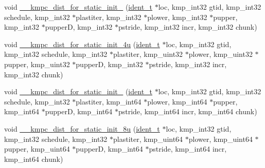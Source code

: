 \begin{DoxyCompactItemize}
\item 
void \hyperlink{group__WORK__SHARING_gab1acaeaf1525bb1d998ba2110c268b24}{\-\_\-\-\_\-kmpc\-\_\-dist\-\_\-for\-\_\-static\-\_\-init\-\_} (\hyperlink{group__BASIC__TYPES_ga690fda6b92f039a72db263c6b4394ddb}{ident\-\_\-t} $\ast$loc, kmp\-\_\-int32 gtid, kmp\-\_\-int32 schedule, kmp\-\_\-int32 $\ast$plastiter, kmp\-\_\-int32 $\ast$plower, kmp\-\_\-int32 $\ast$pupper, kmp\-\_\-int32 $\ast$pupper\-D, kmp\-\_\-int32 $\ast$pstride, kmp\-\_\-int32 incr, kmp\-\_\-int32 chunk)
\item 
void \hyperlink{group__WORK__SHARING_ga7054a4ec6bf4a65dda00a0aab75db65f}{\-\_\-\-\_\-kmpc\-\_\-dist\-\_\-for\-\_\-static\-\_\-init\-\_\-4u} (\hyperlink{group__BASIC__TYPES_ga690fda6b92f039a72db263c6b4394ddb}{ident\-\_\-t} $\ast$loc, kmp\-\_\-int32 gtid, kmp\-\_\-int32 schedule, kmp\-\_\-int32 $\ast$plastiter, kmp\-\_\-uint32 $\ast$plower, kmp\-\_\-uint32 $\ast$pupper, kmp\-\_\-uint32 $\ast$pupper\-D, kmp\-\_\-int32 $\ast$pstride, kmp\-\_\-int32 incr, kmp\-\_\-int32 chunk)
\item 
void \hyperlink{group__WORK__SHARING_ga21ff57e990e07b43d08dfb4214d928c8}{\-\_\-\-\_\-kmpc\-\_\-dist\-\_\-for\-\_\-static\-\_\-init\-\_} (\hyperlink{group__BASIC__TYPES_ga690fda6b92f039a72db263c6b4394ddb}{ident\-\_\-t} $\ast$loc, kmp\-\_\-int32 gtid, kmp\-\_\-int32 schedule, kmp\-\_\-int32 $\ast$plastiter, kmp\-\_\-int64 $\ast$plower, kmp\-\_\-int64 $\ast$pupper, kmp\-\_\-int64 $\ast$pupper\-D, kmp\-\_\-int64 $\ast$pstride, kmp\-\_\-int64 incr, kmp\-\_\-int64 chunk)
\item 
void \hyperlink{group__WORK__SHARING_gac7d4d8d2d7f5d33b5c2b33d89b3ec0af}{\-\_\-\-\_\-kmpc\-\_\-dist\-\_\-for\-\_\-static\-\_\-init\-\_\-8u} (\hyperlink{group__BASIC__TYPES_ga690fda6b92f039a72db263c6b4394ddb}{ident\-\_\-t} $\ast$loc, kmp\-\_\-int32 gtid, kmp\-\_\-int32 schedule, kmp\-\_\-int32 $\ast$plastiter, kmp\-\_\-uint64 $\ast$plower, kmp\-\_\-uint64 $\ast$pupper, kmp\-\_\-uint64 $\ast$pupper\-D, kmp\-\_\-int64 $\ast$pstride, kmp\-\_\-int64 incr, kmp\-\_\-int64 chunk)
\end{DoxyCompactItemize}
